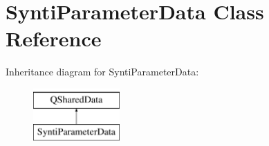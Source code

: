 \hypertarget{class_synti_parameter_data}{}\section{Synti\+Parameter\+Data Class Reference}
\label{class_synti_parameter_data}
Inheritance diagram for Synti\+Parameter\+Data\+:\begin{figure}[H]
\begin{center}
\leavevmode
\includegraphics[height=2.000000cm]{class_synti_parameter_data}
\end{center}
\end{figure}
